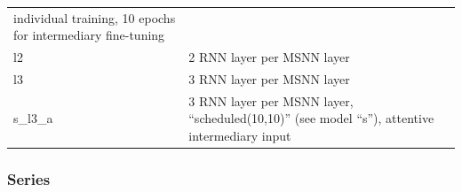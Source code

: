 \begin{longtable}[]{@{}ll@{}}
\begin{minipage}[t]{0.86\columnwidth}
individual training, 10 epochs for intermediary fine-tuning\strut
\end{minipage}\tabularnewline
\begin{minipage}[t]{0.08\columnwidth}\raggedright\strut
l2\strut
\end{minipage} & \begin{minipage}[t]{0.86\columnwidth}\raggedright\strut
2 RNN layer per MSNN layer\strut
\end{minipage}\tabularnewline
\begin{minipage}[t]{0.08\columnwidth}\raggedright\strut
l3\strut
\end{minipage} & \begin{minipage}[t]{0.86\columnwidth}\raggedright\strut
3 RNN layer per MSNN layer\strut
\end{minipage}\tabularnewline
\begin{minipage}[t]{0.08\columnwidth}\raggedright\strut
s\_l3\_a\strut
\end{minipage} & \begin{minipage}[t]{0.86\columnwidth}\raggedright\strut
3 RNN layer per MSNN layer, ``scheduled(10,10)'' (see model ``s''),
attentive intermediary input\strut
\end{minipage}\tabularnewline
\hline
\end{longtable}

\subsubsection{Series}


